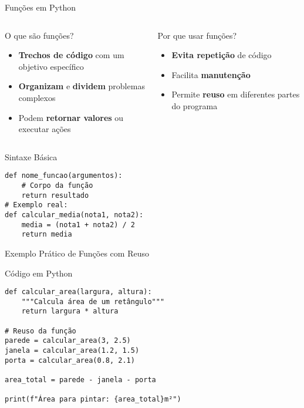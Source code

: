 \begin{frame}[fragile]{Funções em Python}


    \begin{columns}
        \begin{block}{O que são funções?}
            \begin{itemize}
                \item \textbf{Trechos de código} com um objetivo específico
                \item \textbf{Organizam} e \textbf{dividem} problemas complexos
                \item Podem \textbf{retornar valores} ou executar ações
            \end{itemize}
        \end{block}

        \begin{alertblock}{Por que usar funções?}
            \begin{itemize}
                \item \textbf{Evita repetição} de código
                \item Facilita \textbf{manutenção}
                \item Permite \textbf{reuso} em diferentes partes do programa
            \end{itemize}
        \end{alertblock}
    \end{columns}


    \begin{exampleblock}{Sintaxe Básica}
        \begin{verbatim}
def nome_funcao(argumentos):
    # Corpo da função
    return resultado
# Exemplo real:
def calcular_media(nota1, nota2):
    media = (nota1 + nota2) / 2
    return media
\end{verbatim}
    \end{exampleblock}


\end{frame}

\begin{frame}[fragile]{Exemplo Prático de Funções com Reuso}



    \begin{block}{Código em Python}
        \begin{verbatim}
def calcular_area(largura, altura):
    """Calcula área de um retângulo"""
    return largura * altura

# Reuso da função
parede = calcular_area(3, 2.5)
janela = calcular_area(1.2, 1.5)
porta = calcular_area(0.8, 2.1)

area_total = parede - janela - porta

print(f"Área para pintar: {area_total}m²")
\end{verbatim}
    \end{block}




\end{frame}

